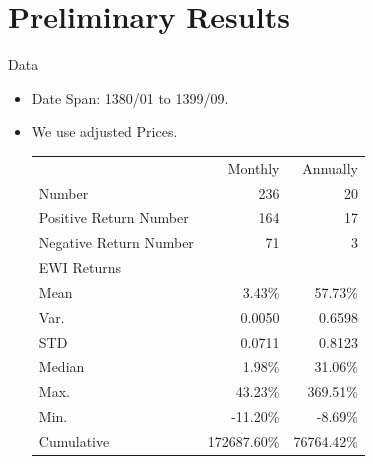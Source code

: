 \documentclass{beamer}
\begin{document}
\section{Preliminary Results}

\begin{frame}{Data}
    \begin{itemize}
        \item Date Span: 1380/01 to 1399/09.
        \item We use adjusted Prices.
              \begin{center}
                  \begin{tabular}{l r r}
                                             & Monthly     & Annually   \\ \cline{2-3}
                      Number                 & 236         & 20         \\
                      Positive Return Number & 164         & 17         \\
                      Negative Return Number & 71          & 3          \\ \hline
                      EWI Returns            &             &            \\ \hline
                      Mean                   & 3.43\%      & 57.73\%    \\
                      Var.                   & 0.0050      & 0.6598     \\
                      STD                    & 0.0711      & 0.8123     \\
                      Median                 & 1.98\%      & 31.06\%    \\
                      Max.                   & 43.23\%     & 369.51\%   \\
                      Min.                   & -11.20\%    & -8.69\%    \\
                      Cumulative             & 172687.60\% & 76764.42\%
                  \end{tabular}
              \end{center}
    \end{itemize}
\end{frame}
\end{document}
